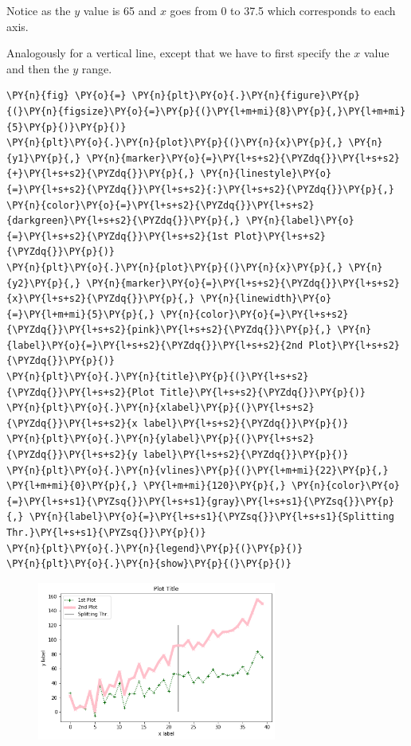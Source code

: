 Notice as the \(y\) value is 65 and \(x\) goes from 0 to 37.5 which
corresponds to each axis.

Analogously for a vertical line, except that we have to first specify
the \(x\) value and then the \(y\) range.

\begin{tcolorbox}[breakable, size=fbox, boxrule=1pt, pad at break*=1mm,colback=cellbackground, colframe=cellborder]
\begin{Verbatim}[commandchars=\\\{\}]
\PY{n}{fig} \PY{o}{=} \PY{n}{plt}\PY{o}{.}\PY{n}{figure}\PY{p}{(}\PY{n}{figsize}\PY{o}{=}\PY{p}{(}\PY{l+m+mi}{8}\PY{p}{,}\PY{l+m+mi}{5}\PY{p}{)}\PY{p}{)}
\PY{n}{plt}\PY{o}{.}\PY{n}{plot}\PY{p}{(}\PY{n}{x}\PY{p}{,} \PY{n}{y1}\PY{p}{,} \PY{n}{marker}\PY{o}{=}\PY{l+s+s2}{\PYZdq{}}\PY{l+s+s2}{+}\PY{l+s+s2}{\PYZdq{}}\PY{p}{,} \PY{n}{linestyle}\PY{o}{=}\PY{l+s+s2}{\PYZdq{}}\PY{l+s+s2}{:}\PY{l+s+s2}{\PYZdq{}}\PY{p}{,} \PY{n}{color}\PY{o}{=}\PY{l+s+s2}{\PYZdq{}}\PY{l+s+s2}{darkgreen}\PY{l+s+s2}{\PYZdq{}}\PY{p}{,} \PY{n}{label}\PY{o}{=}\PY{l+s+s2}{\PYZdq{}}\PY{l+s+s2}{1st Plot}\PY{l+s+s2}{\PYZdq{}}\PY{p}{)}
\PY{n}{plt}\PY{o}{.}\PY{n}{plot}\PY{p}{(}\PY{n}{x}\PY{p}{,} \PY{n}{y2}\PY{p}{,} \PY{n}{marker}\PY{o}{=}\PY{l+s+s2}{\PYZdq{}}\PY{l+s+s2}{x}\PY{l+s+s2}{\PYZdq{}}\PY{p}{,} \PY{n}{linewidth}\PY{o}{=}\PY{l+m+mi}{5}\PY{p}{,} \PY{n}{color}\PY{o}{=}\PY{l+s+s2}{\PYZdq{}}\PY{l+s+s2}{pink}\PY{l+s+s2}{\PYZdq{}}\PY{p}{,} \PY{n}{label}\PY{o}{=}\PY{l+s+s2}{\PYZdq{}}\PY{l+s+s2}{2nd Plot}\PY{l+s+s2}{\PYZdq{}}\PY{p}{)}
\PY{n}{plt}\PY{o}{.}\PY{n}{title}\PY{p}{(}\PY{l+s+s2}{\PYZdq{}}\PY{l+s+s2}{Plot Title}\PY{l+s+s2}{\PYZdq{}}\PY{p}{)}
\PY{n}{plt}\PY{o}{.}\PY{n}{xlabel}\PY{p}{(}\PY{l+s+s2}{\PYZdq{}}\PY{l+s+s2}{x label}\PY{l+s+s2}{\PYZdq{}}\PY{p}{)}
\PY{n}{plt}\PY{o}{.}\PY{n}{ylabel}\PY{p}{(}\PY{l+s+s2}{\PYZdq{}}\PY{l+s+s2}{y label}\PY{l+s+s2}{\PYZdq{}}\PY{p}{)}
\PY{n}{plt}\PY{o}{.}\PY{n}{vlines}\PY{p}{(}\PY{l+m+mi}{22}\PY{p}{,} \PY{l+m+mi}{0}\PY{p}{,} \PY{l+m+mi}{120}\PY{p}{,} \PY{n}{color}\PY{o}{=}\PY{l+s+s1}{\PYZsq{}}\PY{l+s+s1}{gray}\PY{l+s+s1}{\PYZsq{}}\PY{p}{,} \PY{n}{label}\PY{o}{=}\PY{l+s+s1}{\PYZsq{}}\PY{l+s+s1}{Splitting Thr.}\PY{l+s+s1}{\PYZsq{}}\PY{p}{)}
\PY{n}{plt}\PY{o}{.}\PY{n}{legend}\PY{p}{(}\PY{p}{)}
\PY{n}{plt}\PY{o}{.}\PY{n}{show}\PY{p}{(}\PY{p}{)}
\end{Verbatim}
\end{tcolorbox}

\begin{figure}[h]
	\centering
	\includegraphics[width=0.7\textwidth]{figures/matplotlib_31_0.png}
\end{figure}

